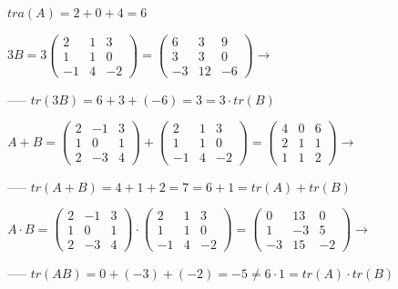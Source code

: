 \begin{proofw}\renewcommand{\qedsymbol}{$\diamond$}
	
\noindent $tra(A)=2+0+4=6$
	
\noindent $3B=3\left( \begin{matrix} 2&1&3\\1&1&0\\-1&4&-2  \end{matrix} \right)
	=\left( \begin{matrix} 6&3&9\\3&3&0\\-3&12&-6  \end{matrix} \right) \to $
	
----- \hspace{5mm} $tr(3B)=6+3+(-6)=3=3\cdot tr(B)$
	
\noindent $A+B=\left( \begin{matrix} 2&-1&3\\1&0&1\\2&-3&4   \end{matrix} \right)+\left( \begin{matrix} 2&1&3\\1&1&0\\-1&4&-2  \end{matrix} \right)=\left( \begin{matrix} 4&0&6\\2&1&1\\1&1&2  \end{matrix} \right) \to $

----- \hspace{5mm}  $tr(A+B)=4+1+2=7=6+1=tr(A)+tr(B)$

\noindent $A\cdot B=\left( \begin{matrix} 2&-1&3\\1&0&1\\2&-3&4   \end{matrix} \right) \cdot \left( \begin{matrix} 2&1&3\\1&1&0\\-1&4&-2  \end{matrix} \right)=\left( \begin{matrix} 0&13&0\\1&-3&5\\-3&15&-2  \end{matrix} \right) \to $

----- \hspace{5mm}  $tr(AB)=0+(-3)+(-2)=-5 \neq 6 \cdot 1 = tr(A)\cdot tr(B)$
\end{proofw}

